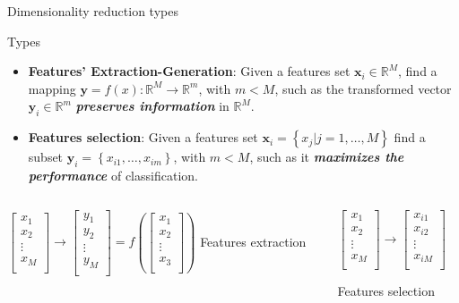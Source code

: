 \documentclass[xcolor=x11names,compress,10pt]{beamer}
\renewcommand{\(}{\begin{columns}}
\renewcommand{\)}{\end{columns}}
\newcommand{\<}[1]{\begin{column}{#1}}
\renewcommand{\>}{\end{column}}
\begin{document}
\begin{frame}{Dimensionality reduction types}
\begin{block}{Types}
\begin{itemize}
	\item \textbf{Features' Extraction-Generation}: Given a features set $\mathbf{x}_i \in \mathbb{R} ^M$, find a mapping $\mathbf{y} = f(x):\mathbb{R}^M \to \mathbb{R}^m$, with $m<M$, such as the transformed vector $\mathbf{y}_i \in \mathbb{R}^m$ \textbf{\emph{preserves information}} in $\mathbb{R}^M$.
	\item \textbf{Features selection}: Given a features set $\mathbf{x}_i = \left \{ x_j | j = 1, \ldots, M  \right \}$ find a subset $\mathbf{y}_i=\left \{x_{i1},\ldots,x_{im} \right \}$, with $m<M$, such as it \textbf{\emph{maximizes the performance}} of classification.
\end{itemize}
\end{block}

\begin{columns}[onlytextwidth]
    \begin{column}{0.45\textwidth}
      \centering
      		$	
		\begin{bmatrix}
			x_1\\ 
			x_2\\ 
			\vdots\\ 
			x_M\\ 
			\end{bmatrix}
			\to
			\begin{bmatrix}
			y_1\\ 
			y_2\\ 
			\vdots\\ 
			y_M\\ 
			\end{bmatrix}
			=f \left (
			\begin{bmatrix}
			x_1\\ 
			x_2\\ 
			\vdots\\ 
			x_3\\ 
			\end{bmatrix}
			\right ) 
		$
		{\small Features extraction}
    \end{column}
    \begin{column}{0.45\textwidth}
      \centering
      $
	\begin{bmatrix}
	x_1\\ 
	x_2\\ 
	\vdots\\ 
	x_M\\ 
	\end{bmatrix}
	\to
	\begin{bmatrix}
	x_{i1}\\ 
	x_{i2}\\ 
	\vdots\\ 
	x_{iM}\\ 
	\end{bmatrix}
	$

	{\small Features selection}
    \end{column}
    \end{columns}
\end{frame}
\end{document}
